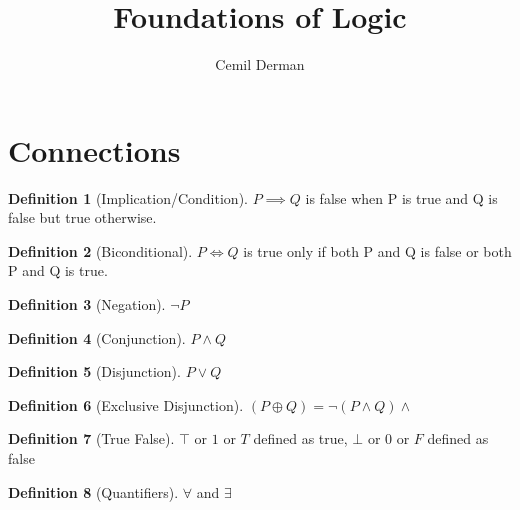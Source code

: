 \documentclass{article}
\title{Foundations of Logic}
\author{Cemil Derman}
\theoremstyle{definition}
\newtheorem{definition}{Definition}[section]
\begin{document}
    \maketitle
    \section{Connections}
    \begin{definition}[Implication/Condition]
      $P \implies Q$  is false when P is true and Q is false but true otherwise.

       


    \end{definition}
    \begin{definition}[Biconditional]
      $P \iff{Q}$ is true only if both P and Q is false or both P and Q is true.
      
    \end{definition}
    
    \begin{definition}[Negation]
      $\neg P$
    \end{definition}

    \begin{definition}[Conjunction]
   $P \wedge Q$
      
    \end{definition}


    \begin{definition}[Disjunction]
      $P \lor Q$
      
    \end{definition}

    \begin{definition}[Exclusive Disjunction]
      $(P \oplus Q) = \neg(P \wedge Q) \wedge $ %

    \end{definition}

    \begin{definition}[True False]
      $\top$ or $1$ or $T$ defined as true, 
      $\bot$ or $0$ or $F$ defined as false
      
    \end{definition}
  
    \begin{definition}[Quantifiers]
      $\forall$ and $\exists$ 
      
    \end{definition}
\end{document}
